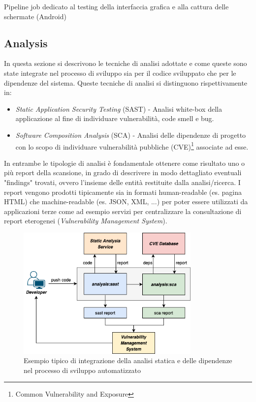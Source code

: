 \begin{listing}[H]
\inputminted{yaml}{code/4-screenshot-ui-android}
\caption{Pipeline job dedicato al testing della interfaccia grafica e alla cattura delle schermate (Android)}
\end{listing}


\subsection{Analysis}
In questa sezione si descrivono le tecniche di analisi adottate e come queste sono state integrate nel processo di sviluppo sia per il codice sviluppato che per le dipendenze del sistema. Queste tecniche di analisi si distinguono rispettivamente in:
\begin{itemize}
    \item \textit{Static Application Security Testing} (SAST) - Analisi white-box della applicazione al fine di individuare vulnerabilità, code smell e bug.
    \item \textit{Software Composition Analysis} (SCA) - Analisi delle dipendenze di progetto con lo scopo di individuare vulnerabilità pubbliche (CVE)\footnote{Common Vulnerability and Exposure} associate ad esse.
\end{itemize}
In entrambe le tipologie di analisi è fondamentale ottenere come risultato uno o più report della scansione, in grado di descrivere in modo dettagliato eventuali "findings" trovati, ovvero l'insieme delle entità restituite dalla analisi/ricerca. I report vengono prodotti tipicamente sia in formati human-readable (es. pagina HTML) che machine-readable (es. JSON, XML, ...) per poter essere utilizzati da applicazioni terze come ad esempio servizi per centralizzare la consultazione di report eterogenei (\textit{Vulnerability Management System}).

\begin{figure}[H]
\centering
\includegraphics[width=0.8\textwidth]{img/tesi-12-sastsca.drawio.png}
\caption{Esempio tipico di integrazione della analisi statica e delle dipendenze nel processo di sviluppo automatizzato}
\end{figure}

